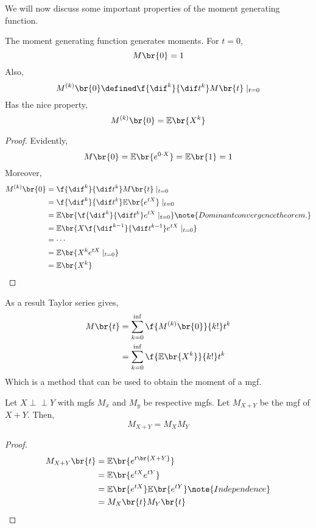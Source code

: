 \documentclass{article}
\newcommand{\indep}{\!\!\perp\!\!\!\!\perp\!\!}
\newcommand{\Exp}{\mathbb{E}}
\newcommand{\Mom}{M}
\begin{document}
We will now discuss some important properties of the moment generating function.
\begin{theorem}
    The moment generating function generates moments. For $t = 0$,
    \[ \Mom\br{0} = 1 \]
    Also,
    \[ \Mom^{(k)} \br{0} \defined \f{\dif^k}{\dif t^k} \Mom\br{t}\mid_{t=0} \]
    Has the nice property,
    \[ \Mom^{(k)} \br{0} = \Exp\br{X^k} \]
\end{theorem}
\begin{proof}
    Evidently,
    \[ \Mom\br{0} = \Exp\br{e^{0\cdot X}} = \Exp\br{1} = 1 \]
    Moreover,
    \begin{align*}
        \Mom^{(k)} \br{0} &= \f{\dif^k}{\dif t^k} \Mom\br{t}\mid_{t=0} \\
        &= \f{\dif^k}{\dif t^k} \Exp\br{e^{tX}}\mid_{t=0} \\
        &= \Exp\br{\f{\dif^k}{\dif t^k} e^{tX}\mid_{t=0}} \note{Dominant convergence theorem.} \\
        &= \Exp\br{X\f{\dif^{k-1}}{\dif t^{k-1}} e^{tX}\mid_{t=0}} \\
        &= \cdots \\
        &= \Exp\br{X^k e^{tX}\mid_{t=0}} \\
        &= \Exp\br{X^k}
    \end{align*}
\end{proof}
As a result Taylor series gives,
\begin{align*}
    M\br{t} &= \sum_{k=0}^{\inf} \f{M^{(k)}\br{0}}{k!}t^k \\
    &= \sum_{k=0}^{\inf} \f{\Exp\br{X^k}}{k!}t^k \\
\end{align*}
Which is a method that can be used to obtain the moment of a mgf.
\begin{theorem}
    \label{thm:sum_mgf}
    Let $X\indep Y$ with mgfs $\Mom_x$ and $\Mom_y$ be respective mgfs. Let $\Mom_{X+Y}$ be the mgf of $X+Y$. Then,
    \[ \Mom_{X+Y} = \Mom_X\Mom_Y \]
\end{theorem}
\begin{proof}
    \begin{align*}
        \Mom_{X+Y}\br{t} &= \Exp\br{e^{t\br{X+Y}}} \\
        &= \Exp\br{e^{tX}e^{tY}} \\
        &= \Exp\br{e^{tX}}\Exp\br{e^{tY}} \note{Independence} \\
        &= \Mom_X\br{t} \Mom_Y\br{t}
    \end{align*}
\end{proof}
\end{document}
